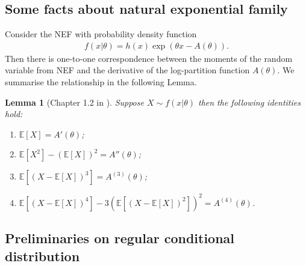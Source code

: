 \documentclass[12pt]{article}
\newtheorem{lemma}{Lemma}
\theoremstyle{definition}
\newcommand{\E}{\mathbb E}								%
\begin{document}
\subsection{Some facts about natural exponential family}

Consider the NEF with probability density function
\begin{align*}
  f(x|\theta)=h(x)\exp(\theta x-A(\theta)).
\end{align*}
Then there is one-to-one correspondence between the moments of the random variable from NEF and the derivative of the log-partition function $A(\theta)$. We summarise the relationship in the following Lemma.

\begin{lemma}[Chapter 1.2 in \cite{Efron2022}]\label{lem:moment_logpartition}
  Suppose $X\sim f(x|\theta)$ then the following identities hold:
  \begin{enumerate}
    \item $\E[X]=A'(\theta)$;
    \item $\E[X^2]-(\E[X])^2=A''(\theta)$;
    \item $\E[(X-\E[X])^3]=A^{(3)}(\theta)$;
    \item $\E[(X-\E[X])^4]-3\left(\E[(X-\E[X])^2]\right)^2=A^{(4)}(\theta)$.
  \end{enumerate}
\end{lemma}

\subsection{Preliminaries on regular conditional distribution}\label{sec:RCD_preliminary}
\end{document}
